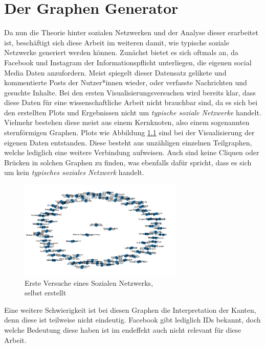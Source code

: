 \chapter{Der Graphen Generator}\label{ch:generierung}
Da nun die Theorie hinter sozialen Netzwerken und der Analyse dieser erarbeitet ist, beschäftigt sich diese Arbeit im weiteren damit, wie typische soziale Netzwerke generiert werden können. 
Zunächst bietet es sich oftmals an, da Facebook und Instagram der Informationspflicht unterliegen, die eigenen social Media Daten anzufordern. Meist spiegelt dieser Datensatz gelikete und kommentierte Posts der Nutzer*innen wieder, oder verfasste Nachrichten und gesuchte Inhalte.
Bei den ersten Visualisierungsversuchen wird bereits klar, dass diese Daten für eine wissenschaftliche Arbeit nicht brauchbar sind, da es sich bei den erstellten Plots und Ergebnissen nicht um \textit{ typische soziale Netzwerke} handelt. Vielmehr bestehen diese meist aus einem Kernknoten, also einem sogenannten sternförmigen Graphen. Plots wie Abbildung \ref{fig:OwnData} sind bei der Visualisierung der eigenen Daten entstanden. Diese besteht aus unzähligen einzelnen Teilgraphen, welche lediglich eine weitere Verbindung aufweisen. Auch sind keine Cliquen oder Brücken in solchen Graphen zu finden, was ebenfalls dafür spricht, dass es sich um kein \textit{typisches soziales Netzwerk} handelt. \\
\FloatBarrier
\begin{figure}[h!]
    \centering
    \includegraphics[width=0.7\textwidth]{Graphics/PlotOwnData.png}
    \caption{Erste Versuche eines Sozialen Netzwerks, \\
    selbst erstellt}
    \label{fig:OwnData}
\end{figure}
\FloatBarrier

Eine weitere Schwierigkeit ist bei diesen Graphen die Interpretation der Kanten, denn diese ist teilweise nicht eindeutig. 
Facebook gibt lediglich IDs bekannt, doch welche Bedeutung diese haben ist im endeffekt auch nicht relevant für diese Arbeit.

